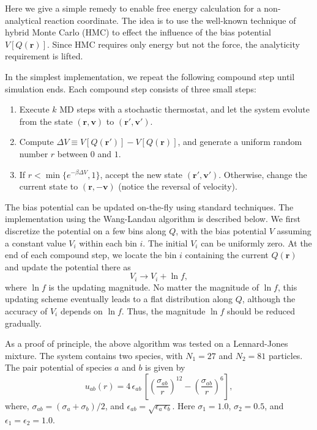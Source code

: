 \documentclass[aip,jcp,preprint,superscriptaddress]{revtex4-1}
\newcommand{\vct}[1]{\mathbf{#1}}
\newcommand{\vr}{\vct{r}}
\newcommand{\vv}{\vct{v}}
\begin{document}
%
Here we give a simple remedy
to enable free energy calculation
for a non-analytical reaction coordinate.
%
The idea is to use
the well-known technique of hybrid Monte Carlo (HMC)
to effect the influence of the bias potential $V[Q(\vr)]$.
%
Since HMC requires only energy but not the force,
the analyticity requirement is lifted.



%
In the simplest implementation,
we repeat the following compound step until simulation ends.
%
Each compound step consists of three small steps:
%
\begin{enumerate}
  \item Execute $k$ MD steps with a stochastic thermostat,
        and let the system evolute
        from the state $(\vr, \vv)$ to $(\vr', \vv')$.

  \item Compute $\Delta V \equiv V[Q(\vr')] - V[Q(\vr)]$,
        and generate a uniform random number $r$ between $0$ and $1$.

  \item If $r < \min\{e^{-\beta \Delta V}, 1\}$,
        accept the new state $(\vr', \vv')$.
        Otherwise, change the current state to $(\vr, -\vv)$
        (notice the reversal of velocity).
\end{enumerate}



%
The bias potential can be updated on-the-fly
using standard techniques.
%
The implementation using the Wang-Landau algorithm
is described below.
%
We first discretize the potential on a few bins along $Q$,
with the bias potential $V$ assuming a constant value $V_i$
within each bin $i$.
%
The initial $V_i$ can be uniformly zero.
%
At the end of each compound step,
we locate the bin $i$ containing the current $Q(\vr)$
and update the potential there as
%
\begin{equation}
V_i \rightarrow V_i + \ln f,
\end{equation}
%
where $\ln f$ is the updating magnitude.
%
No matter the magnitude of $\ln f$,
this updating scheme eventually leads to a flat distribution along $Q$,
although the accuracy of $V_i$ depends on $\ln f$.
%
Thus, the magnitude $\ln f$ should be reduced gradually.



%
As a proof of principle,
the above algorithm was tested on a Lennard-Jones mixture.
%
The system contains two species,
with $N_1 = 27$ and $N_2 = 81$ particles.
%
The pair potential of species $a$ and $b$ is given by
%
\[
  u_{ab}(r)
=
  4 \, \epsilon_{ab} \,
  \left[
    \left(
      \frac{ \sigma_{ab} } { r }
    \right)^{12}
    -
    \left(
      \frac{ \sigma_{ab} } { r }
    \right)^{6}
  \right],
\]
%
where,
$\sigma_{ab} = (\sigma_a + \sigma_b)/2$,
%
and
$\epsilon_{ab} = \sqrt{\epsilon_a \, \epsilon_b}$.
%
Here
$\sigma_1 = 1.0$,
$\sigma_2 = 0.5$,
and
$\epsilon_1 = \epsilon_2 = 1.0$.
\end{document}
